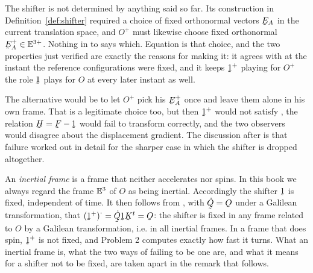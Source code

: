\begin{remark}\label{rem:ch7whyshiftass}
The shifter is not determined by anything said so far. Its construction
in Definition~\ref{def:shifter} required a choice of fixed orthonormal
vectors $\bE_{A}$ in the current translation space, and $O^{+}$ must
likewise choose fixed orthonormal $\bE^{+}_{A}\in\mathbb{E}^{3+}$.
Nothing in  to  says which. Equation  is
that choice, and the two properties just verified are exactly the reasons
for making it: it agrees with  at the instant the reference
configurations were fixed, and it keeps $\shift^{+}$ playing for $O^{+}$
the role $\shift$ plays for $O$ at every later instant as well.

The alternative would be to let $O^{+}$ pick his $\bE^{+}_{A}$ once and
leave them alone in his own frame. That is a legitimate choice too, but
then $\shift^{+}$ would not satisfy , the relation
$\bH=\bF-\shift$ would fail to transform correctly, and the two observers
would disagree about the displacement gradient. The discussion after
 is that failure worked out in detail for the sharper case in
which the shifter is dropped altogether.

An \emph{inertial frame} is a frame that neither accelerates nor spins.
In this book we always regard the frame $\mathbb{E}^{3}$ of $O$ as being inertial.
Accordingly the shifter $\shift$ is fixed, independent of time. It then
follows from , with $\dot\bQ=\Ob$ under a Galilean
transformation, that $(\shift^{+})^{\textstyle\cdot}
=\dot\bQ\shift\bK^{t}=\Ob$: the shifter is fixed in any frame related to
$O$ by a Galilean transformation, i.e. in all inertial frames. In a
frame that does spin, $\shift^{+}$ is not fixed, and Problem 2 computes
exactly how fast it turns. What an inertial frame is, what the two ways
of failing to be one are, and what it means for a shifter not to be
fixed, are taken apart in the remark that follows.
\end{remark}

